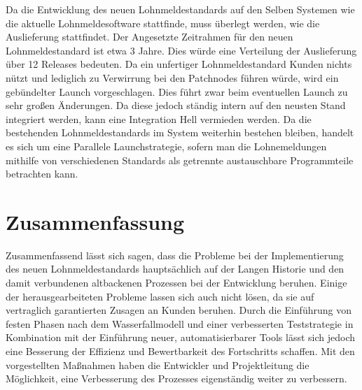 Da die Entwicklung des neuen Lohnmeldestandards auf den Selben Systemen wie die aktuelle Lohnmeldesoftware stattfinde, muss überlegt werden, wie die Auslieferung stattfindet.
Der Angesetzte Zeitrahmen für den neuen Lohnmeldestandard ist etwa 3 Jahre. Dies würde eine Verteilung der Auslieferung über 12 Releases bedeuten. Da ein unfertiger Lohnmeldestandard Kunden nichts nützt und lediglich zu Verwirrung bei den Patchnodes führen würde, wird ein gebündelter Launch vorgeschlagen. Dies führt zwar beim eventuellen Launch zu sehr großen Änderungen. Da diese jedoch ständig intern auf den neusten Stand integriert werden, kann eine Integration Hell vermieden werden.
Da die bestehenden Lohnmeldestandards im System weiterhin bestehen bleiben, handelt es sich um eine Parallele Launchstrategie, sofern man die Lohnemeldungen mithilfe von verschiedenen Standards als getrennte austauschbare Programmteile betrachten kann.


\chapter{Zusammenfassung}

Zusammenfassend lässt sich sagen, dass die Probleme bei der Implementierung des neuen Lohnmeldestandards hauptsächlich auf der Langen Historie und den damit verbundenen altbackenen Prozessen bei der Entwicklung beruhen. 
Einige der herausgearbeiteten Probleme lassen sich auch nicht lösen, da sie auf vertraglich garantierten Zusagen an Kunden beruhen.
Durch die Einführung von festen Phasen nach dem Wasserfallmodell und einer verbesserten Teststrategie in Kombination mit der Einführung neuer, automatisierbarer Tools lässt sich jedoch eine Besserung der Effizienz und Bewertbarkeit des Fortschritts schaffen.
Mit den vorgestellten Maßnahmen haben die Entwickler und Projektleitung die Möglichkeit, eine Verbesserung des Prozesses eigenständig weiter zu verbessern.